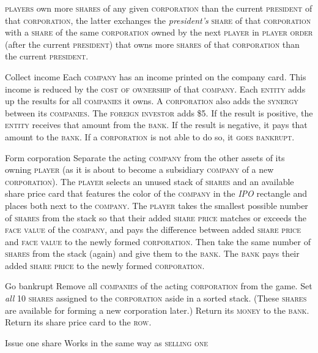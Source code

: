 \documentclass[8pt]{extarticle}
\newenvironment{my_description}
  {\begin{list}{}{\setlength{\labelwidth}{0pt}
   \leftmargin=1.2em
   \setlength{\itemindent}{-\leftmargin}
   \renewcommand{\makelabel}{\descriptionlabel}}
  \setlength{\itemsep}{1pt}
  \setlength{\parskip}{0pt}
  \setlength{\parsep}{0pt}
  }
  {\end{list}}
\begin{document}
\begin{small}
\begin{multicols}{2}
{\begin{my_description}
  \textsc{players} own more \textsc{shares} of any given
  \textsc{corporation} than the current \textsc{president} of that
  \textsc{corporation}, the latter exchanges the \emph{president's}
  \textsc{share} of that \textsc{corporation} with a \textsc{share} of
  the same \textsc{corporation} owned by the next \textsc{player} in
  \textsc{player order} (after the current \textsc{president})
  that owns more \textsc{shares} of that \textsc{corporation} than
  the current \textsc{president}.
\item[Collect income] Each \textsc{company} has an income printed on
  the company card. This income is reduced by the \textsc{cost of
    ownership} of that \textsc{company}. Each \textsc{entity} adds up
  the results for all \textsc{companies} it owns. A
  \textsc{corporation} also adds the \textsc{synergy} between its
  \textsc{companies}. The \textsc{foreign investor} adds \$5. If the
  result is positive, the \textsc{entity} receives that amount from
  the \textsc{bank}. If the result is negative, it pays that amount to
  the \textsc{bank}. If a \textsc{corporation} is not able to do so,
  it \textsc{goes bankrupt}.
\item[Form corporation] Separate the acting \textsc{company} from the
  other assets of its owning \textsc{player} (as it is about to become
  a subsidiary \textsc{company} of a new \textsc{corporation}). The
  \textsc{player} selects an unused stack of \textsc{shares} and an
  available share price card that features the color of the
  \textsc{company} in the \emph{IPO} rectangle and places both next to
  the \textsc{company}. The \textsc{player} takes the smallest
  possible number of \textsc{shares} from the stack so that their
  added \textsc{share price} matches or exceeds the \textsc{face
    value} of the \textsc{company}, and pays the difference between
  added \textsc{share price} and \textsc{face value} to the newly
  formed \textsc{corporation}. Then take the same number of
  \textsc{shares} from the stack (again) and give them to the
  \textsc{bank}. The \textsc{bank} pays their added \textsc{share
    price} to the newly formed \textsc{corporation}.
\item[Go bankrupt] Remove all \textsc{companies} of the acting
  \textsc{corporation} from the game. Set \emph{all} 10
  \textsc{shares} assigned to the \textsc{corporation} aside in a
  sorted stack. (These \textsc{shares} are available for forming a new
  corporation later.) Return its \textsc{money} to the \textsc{bank}. Return
  its share price card to the \textsc{row}.
\item[Issue one share] Works in the same way as \textsc{selling one
}
\end{my_description}}
\end{multicols}
\end{small}
\end{document}
